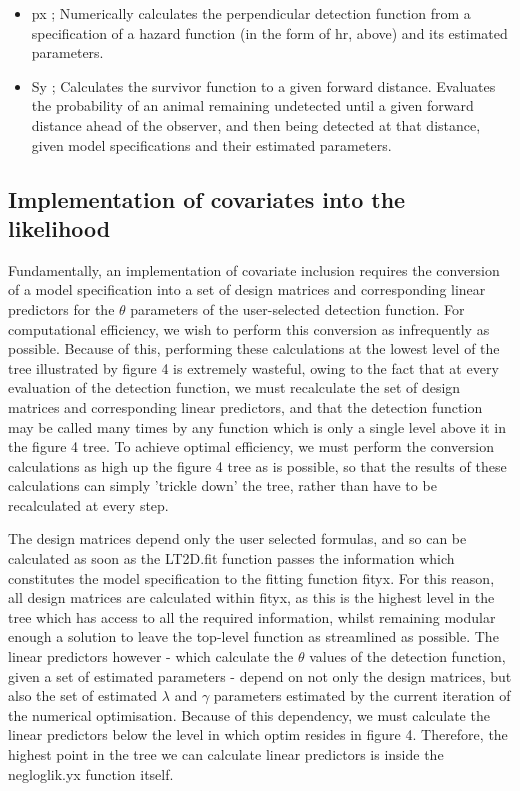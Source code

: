 \documentclass[11pt]{article}
\begin{document}
\begin{multicols}{2}
\begin{itemize}
\item px ; Numerically calculates the perpendicular detection function from a specification of a hazard function (in the form of hr, above) and its estimated parameters.

\item Sy ; Calculates the survivor function to a given forward distance. Evaluates the probability of an animal remaining undetected until a given forward distance ahead of the observer, and then being detected at that distance, given model specifications and their estimated parameters.
\end{itemize}

\subsection{Implementation of covariates into the likelihood}
Fundamentally, an implementation of covariate inclusion requires the conversion of a model specification into a set of design matrices and corresponding linear predictors for the $\theta$ parameters of the user-selected detection function. For computational efficiency, we wish to perform this conversion as infrequently as possible. Because of this, performing these calculations at the lowest level of the tree illustrated by figure 4 is extremely wasteful, owing to the fact that at every evaluation of the detection function, we must recalculate the set of design matrices and corresponding linear predictors, and that the detection function may be called many times by any function which is only a single level above it in the figure 4 tree. To achieve optimal efficiency, we must perform the conversion calculations as high up the figure 4 tree as is possible, so that the results of these calculations can simply 'trickle down' the tree, rather than have to be recalculated at every step.

The design matrices depend only the user selected formulas, and so can be calculated as soon as the LT2D.fit function passes the information which constitutes the model specification to the fitting function fityx. For this reason, all design matrices are calculated within fityx, as this is the highest level in the tree which has access to all the required information, whilst remaining modular enough a solution to leave the top-level function as streamlined as possible. The linear predictors however - which calculate the $\theta$ values of the detection function, given a set of estimated parameters - depend on not only the design matrices, but also the set of estimated $\lambda$ and $\gamma$ parameters estimated by the current iteration of the numerical optimisation. Because of this dependency, we must calculate the linear predictors below the level in which optim resides in figure 4. Therefore, the highest point in the tree we can calculate linear predictors is inside the negloglik.yx function itself. 


\end{multicols}
\end{document}
